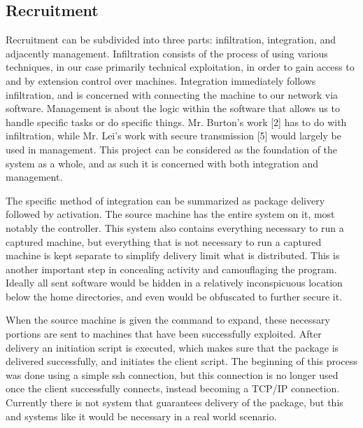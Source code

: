 \subsection{Recruitment}
Recruitment can be subdivided into three parts: infiltration, integration, and adjacently management. Infiltration consists of the process of using various techniques, in our case primarily technical exploitation, in order to gain access to and by extension control over machines. Integration immediately follows infiltration, and is concerned with connecting the machine to our network via software. Management is about the logic within the software that allows us to handle specific tasks or do specific things. Mr. Burton's work [2] has to do with infiltration, while Mr. Lei's work with secure transmission [5] would largely be used in management. This project can be considered as the foundation of the system as a whole, and as such it is concerned with both integration and management.


The specific method of integration can be summarized as package delivery followed by activation. The source machine has the entire system on it, most notably the controller. This system also contains everything necessary to run a captured machine, but everything that is not necessary to run a captured machine is kept separate to simplify delivery limit what is distributed. This is another important step in concealing activity and camouflaging the program. Ideally all sent software would be hidden in a relatively inconspicuous location below the home directories, and even would be obfuscated to further secure it.


When the source machine is given the command to expand, these necessary portions are sent to machines that have been successfully exploited. After delivery an initiation script is executed, which makes sure that the package is delivered successfully, and initiates the client script. The beginning of this process was done using a simple ssh connection, but this connection is no longer used once the client successfully connects, instead becoming a TCP/IP connection. Currently there is not system that guarantees delivery of the package, but this and systems like it would be necessary in a real world scenario.
